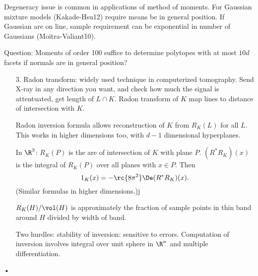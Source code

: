 Degeneracy issue is common in applications of method of moments. For Gaussian mixture models (Kakade-Hsu12) require means be in general position.  If Gaussian are on line, sample requirement can be exponential in number of Gaussians (Moitra-Valiant10). 



Question: Moments of order 100 suffice to determine polytopes with at most $10d$ facets if normals are in general position?
\begin{enumerate}
\item[3.]
Radon transform: widely used technique in computerized tomography. 
Send X-ray in any direction you want, and check how much the signal is attentuated, get length of $L\cap K$. Radon transform of $K$ map lines to distance of intersection with $K$.

Radon inversion formula allows reconstruction of $K$ from $R_K(L)$ for all $L$. This works in higher dimensions too, with $d-1$ dimensional hyperplanes.

In $\R^3$: $R_K(P)$ is the are of intersection of $K$ with plane $P$. $(R^*R_K)(x)$ is the integral of $R_K(P)$ over all planes with $x\in P$. 
Then
$$
1_K(x)=-\rc{8\pi^2}\De (R^*R_K)(x). 
$$
(Similar formulas in higher dimensions.)j

$R_K(H)/\vol(H)$ is approximately the fraction of sample points in thin band around $H$ divided by width of band.%

Two hurdles: stability of inversion: sensitive to errors. Computation of inversion involves integral over unit sphere in $\R^n$ and multiple differentiation.

\end{enumerate}•
